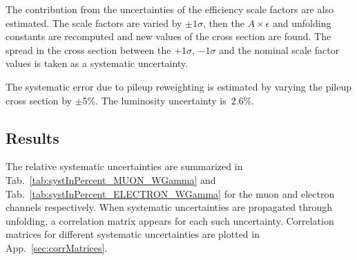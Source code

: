 
The contribution from the uncertainties of the efficiency scale factors are also estimated. The scale factors are varied by $\pm 1\sigma$, then the $A \times \epsilon$ and unfolding constants are recomputed and new values of the cross section are found. The spread in the cross section between the $+1\sigma$, $-1\sigma$ and the nominal scale factor values is taken as a systematic uncertainty.



The systematic error due to pileup reweighting is estimated by varying the pileup cross section by $\pm5\%$. The luminosity uncertainty is~$2.6\%$.

\subsection{Results}

The relative systematic uncertainties are summarized in Tab.~\ref{tab:systInPercent_MUON_WGamma} and Tab.~\ref{tab:systInPercent_ELECTRON_WGamma} for the muon and electron channels respectively. When systematic uncertainties are propagated through unfolding, a correlation matrix appears for each such uncertainty. Correlation matrices for different systematic uncertainties are plotted in App.~\ref{sec:corrMatrices}.

